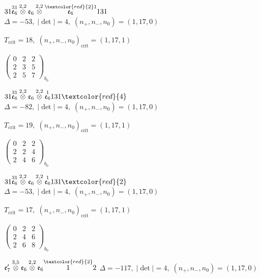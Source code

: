 \documentclass[10pt]{article}
\begin{document}
\smallskip

$31\overset{31}{\mathfrak{e}_6}\overset{2,2}{\otimes}\mathfrak{e}_6\overset{2,2}{\otimes}\overset{\textcolor{red}{2}1}{\mathfrak{e}_6}131$ \quad $\Delta=-53,\; |\det|=4,\; (n_+,n_-,n_0)=(1,17,0)$

\hspace{1em}$T_{\text{crit}}=18,\; (n_+,n_-,n_0)_{\text{crit}}=(1,17,1)$

\hspace{2em}$\left(\begin{smallmatrix}0 & 2 & 2 \\ 2 & 3 & 5 \\ 2 & 5 & 7\end{smallmatrix}\right)_{\!b_0}$

$31\overset{31}{\mathfrak{e}_6}\overset{2,2}{\otimes}\mathfrak{e}_6\overset{2,2}{\otimes}\overset{1}{\mathfrak{e}_6}131\textcolor{red}{4}$ \quad $\Delta=-82,\; |\det|=4,\; (n_+,n_-,n_0)=(1,17,0)$

\hspace{1em}$T_{\text{crit}}=19,\; (n_+,n_-,n_0)_{\text{crit}}=(1,17,1)$

\hspace{2em}$\left(\begin{smallmatrix}0 & 2 & 2 \\ 2 & 2 & 4 \\ 2 & 4 & 6\end{smallmatrix}\right)_{\!b_0}$

$31\overset{31}{\mathfrak{e}_6}\overset{2,2}{\otimes}\mathfrak{e}_6\overset{2,2}{\otimes}\overset{1}{\mathfrak{e}_6}131\textcolor{red}{2}$ \quad $\Delta=-53,\; |\det|=4,\; (n_+,n_-,n_0)=(1,17,0)$

\hspace{1em}$T_{\text{crit}}=17,\; (n_+,n_-,n_0)_{\text{crit}}=(1,17,1)$

\hspace{2em}$\left(\begin{smallmatrix}0 & 2 & 2 \\ 2 & 4 & 6 \\ 2 & 6 & 8\end{smallmatrix}\right)_{\!b_0}$

\smallskip

$\mathfrak{e}_7'\overset{3,5}{\otimes}\mathfrak{e}_6\overset{2,2}{\otimes}\mathfrak{e}_6\overset{\textcolor{red}{2}}{1}2$ \quad $\Delta=-117,\; |\det|=4,\; (n_+,n_-,n_0)=(1,17,0)$
\end{document}
